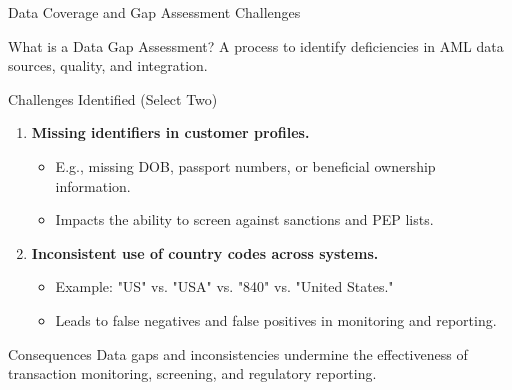 \documentclass{beamer}
\begin{document}
	\begin{frame}{Data Coverage and Gap Assessment Challenges}
		\begin{block}{What is a Data Gap Assessment?}
			A process to identify deficiencies in AML data sources, quality, and integration.
		\end{block}
		\begin{block}{Challenges Identified (Select Two)}
			\begin{enumerate}
				\item \textbf{Missing identifiers in customer profiles.}
				\begin{itemize}
					\item E.g., missing DOB, passport numbers, or beneficial ownership information.
					\item Impacts the ability to screen against sanctions and PEP lists.
				\end{itemize}
				\item \textbf{Inconsistent use of country codes across systems.}
				\begin{itemize}
					\item Example: "US" vs. "USA" vs. "840" vs. "United States."
					\item Leads to false negatives and false positives in monitoring and reporting.
				\end{itemize}
			\end{enumerate}
		\end{block}
		\begin{alertblock}{Consequences}
			Data gaps and inconsistencies undermine the effectiveness of transaction monitoring, screening, and regulatory reporting.
		\end{alertblock}
	\end{frame}
	
\end{document}
